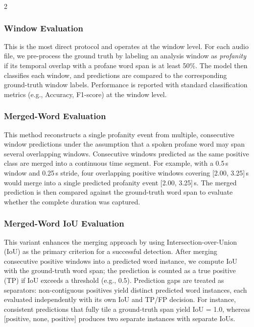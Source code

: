 \documentclass[11pt,a4paper]{article}
\begin{document}
\begin{multicols}{2}
\subsubsection{Window Evaluation}
This is the most direct protocol and operates at the window level. For each audio file, we pre-process the ground truth by labeling an analysis window as \emph{profanity} if its temporal overlap with a profane word span is at least 50\%. The model then classifies each window, and predictions are compared to the corresponding ground-truth window labels. Performance is reported with standard classification metrics (e.g., Accuracy, F1-score) at the window level.

\subsubsection{Merged-Word Evaluation}
This method reconstructs a single profanity event from multiple, consecutive window predictions under the assumption that a spoken profane word may span several overlapping windows. Consecutive windows predicted as the same positive class are merged into a continuous time segment. For example, with a 0.5\,s window and 0.25\,s stride, four overlapping positive windows covering [2.00, 3.25]\,s would merge into a single predicted profanity event [2.00, 3.25]\,s. The merged prediction is then compared against the ground-truth word span to evaluate whether the complete duration was captured.

\subsubsection{Merged-Word IoU Evaluation}
This variant enhances the merging approach by using Intersection-over-Union (IoU) as the primary criterion for a successful detection. After merging consecutive positive windows into a predicted word instance, we compute IoU with the ground-truth word span; the prediction is counted as a true positive (TP) if IoU exceeds a threshold (e.g., 0.5). Prediction gaps are treated as separators: non-contiguous positives yield distinct predicted word instances, each evaluated independently with its own IoU and TP/FP decision. For instance, consistent predictions that fully tile a ground-truth span yield IoU = 1.0, whereas [positive, none, positive] produces two separate instances with separate IoUs.


\end{multicols}
\end{document}
